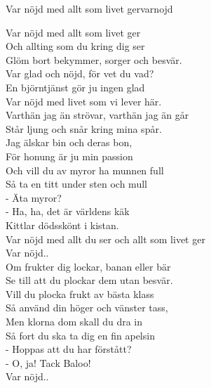 \begin{song}{Var nöjd med allt som livet ger}{varnojd}
\begin{vers}
Var nöjd med allt som livet ger \\
Och allting som du kring dig ser\\
Glöm bort bekymmer, sorger och besvär. \\
Var glad och nöjd, för vet du vad? \\
En björntjänst gör ju ingen glad\\
Var nöjd med livet som vi lever här. \\
Varthän jag än strövar, varthän jag än går \\
Står ljung och snår kring mina spår. \\
Jag älskar bin och deras bon, \\
För honung är ju min passion\\
Och vill du av myror ha munnen full \\
Så ta en titt under sten och mull\\
- Äta myror?\\
- Ha, ha, det är världens käk\\
Kittlar dödsskönt i kistan. \\
Var nöjd med allt du ser och allt som livet ger\\
Var nöjd..\\
Om frukter dig lockar, banan eller bär\\
Se till att du plockar dem utan besvär. \\
Vill du plocka frukt av bästa klass \\
Så använd din höger och vänster tass, \\
Men klorna dom skall du dra in\\
Så fort du ska ta dig en fin apelsin\\
- Hoppas att du har förstått?\\
- O, ja! Tack Baloo!\\
Var nöjd..\\
\end{vers}
\end{song}
